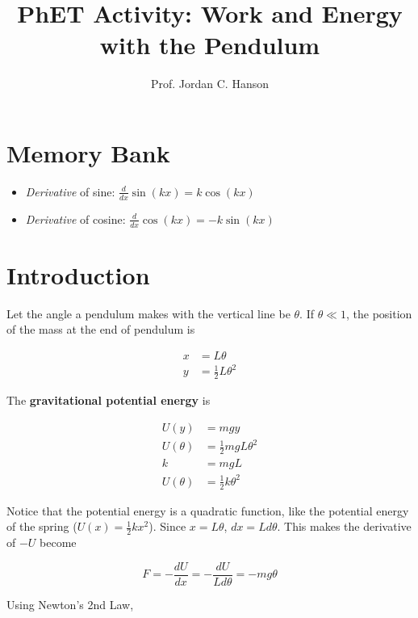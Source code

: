 \documentclass{article}
\begin{document}
\twocolumn

\title{PhET Activity: Work and Energy with the Pendulum}
\author{Prof. Jordan C. Hanson}

\maketitle

\section{Memory Bank}

\begin{itemize}
\item \textit{Derivative} of sine: $\frac{d}{dx} \sin(kx) = k\cos(kx)$
\item \textit{Derivative} of cosine: $\frac{d}{dx} \cos(kx) = -k\sin(kx)$
\end{itemize}

\section{Introduction}

Let the angle a pendulum makes with the vertical line be $\theta$.  If $\theta \ll 1$, the position of the mass at the end of pendulum is

\begin{align}
x &= L\theta \\
y &= \frac{1}{2}L\theta^2
\end{align}

The \textbf{gravitational potential energy} is 

\begin{align}
U(y) &= mgy \\
U(\theta) &= \frac{1}{2}mgL\theta^2 \\
k &= mgL \\
U(\theta) &= \frac{1}{2}k\theta^2
\end{align}

Notice that the potential energy is a quadratic function, like the potential energy of the spring ($U(x) = \frac{1}{2} k x^2$).  Since $x = L\theta$, $dx = Ld\theta$.  This makes the derivative of $-U$ become

\begin{equation}
F = -\frac{dU}{dx} = -\frac{dU}{Ld\theta} = -mg\theta
\end{equation}

Using Newton's 2nd Law,
\end{document}
